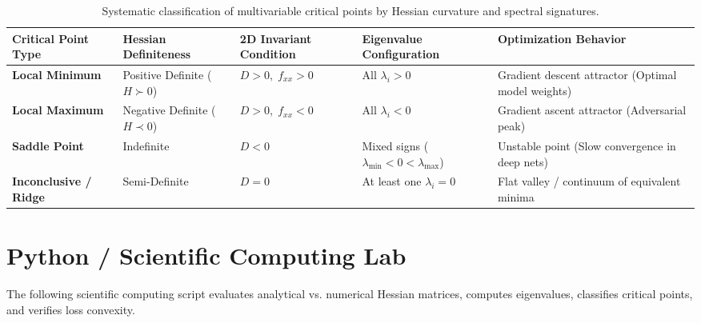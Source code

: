 \begin{table}[htbp]
\centering
\small
\begin{tabular}{p{2.8cm} p{2.2cm} p{2.2cm} p{3.2cm} p{3.2cm}}
\toprule
\textbf{Critical Point Type} & \textbf{Hessian Definiteness} & \textbf{2D Invariant Condition} & \textbf{Eigenvalue Configuration} & \textbf{Optimization Behavior} \\
\midrule
\textbf{Local Minimum} & Positive Definite ($H \succ 0$) & $D > 0, \; f_{xx} > 0$ & All $\lambda_i > 0$ & Gradient descent attractor (Optimal model weights) \\
\textbf{Local Maximum} & Negative Definite ($H \prec 0$) & $D > 0, \; f_{xx} < 0$ & All $\lambda_i < 0$ & Gradient ascent attractor (Adversarial peak) \\
\textbf{Saddle Point} & Indefinite & $D < 0$ & Mixed signs ($\lambda_{\min} < 0 < \lambda_{\max}$) & Unstable point (Slow convergence in deep nets) \\
\textbf{Inconclusive / Ridge} & Semi-Definite & $D = 0$ & At least one $\lambda_i = 0$ & Flat valley / continuum of equivalent minima \\
\bottomrule
\end{tabular}
\caption{Systematic classification of multivariable critical points by Hessian curvature and spectral signatures.}
\label{tab:hessian_classification_comparison}
\end{table}

\section{Python / Scientific Computing Lab}

The following scientific computing script evaluates analytical vs. numerical Hessian matrices, computes eigenvalues, classifies critical points, and verifies loss convexity.

